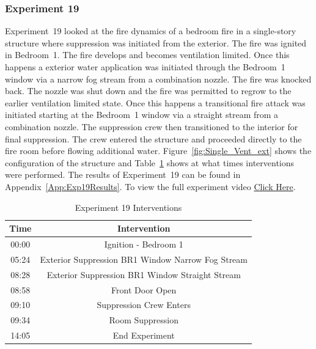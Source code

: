\documentclass[12pt,oneside]{book}
\begin{document}
\subsubsection{Experiment 19}
Experiment~19 looked at the fire dynamics of a bedroom fire in a single-story structure where suppression was initiated from the exterior. The fire was ignited in Bedroom~1. The fire develops and becomes ventilation limited. Once this happens a exterior water application was initiated through the Bedroom~1 window via a narrow fog stream from a combination nozzle. The fire was knocked back. The nozzle was shut down and the fire was permitted to regrow to the earlier ventilation limited state.  Once this happens a transitional fire attack was initiated starting at the Bedroom~1 window via a straight stream from a combination nozzle. The suppression crew then transitioned to the interior for final suppression. The crew entered the structure and proceeded directly to the fire room before flowing additional water. Figure~\ref{fig:Single_Vent_ext} shows the configuration of the structure and Table~\ref{Table:Exp19Interventions} shows at what times interventions were performed. The results of Experiment~19 can be found in Appendix~\ref{App:Exp19Results}. To view the full experiment video \href{https://player.vimeo.com/video/170499621?autoplay=1}{Click Here}.

\begin{table}[H]
	\centering
	\caption{Experiment 19 Interventions}
	\begin{tabular}{|c|c|} 
		\hline
		Time & Intervention \\ \hline \hline
		00:00 & Ignition - Bedroom 1 \\ \hline
		05:24 & Exterior Suppression BR1 Window Narrow Fog Stream \\ \hline
		08:28 & Exterior Suppression BR1 Window Straight Stream \\ \hline
		08:58 & Front Door Open \\ \hline
		09:10 & Suppression Crew Enters\\ \hline
		09:34 & Room Suppression \\ \hline 
		14:05 & End Experiment\\ \hline
	\end{tabular}
	\label{Table:Exp19Interventions}
\end{table}

\FloatBarrier
\end{document}
